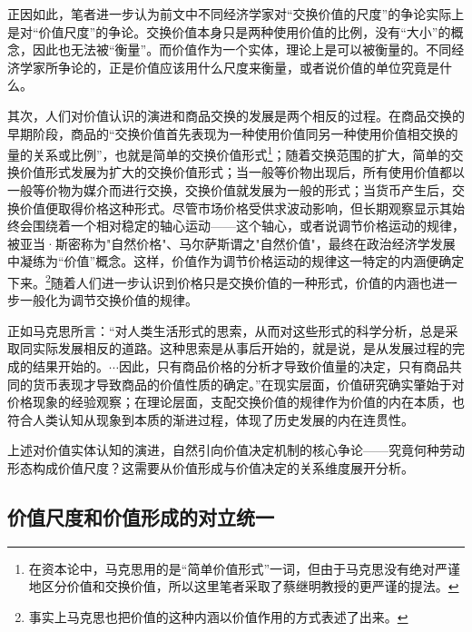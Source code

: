 正因如此，笔者进一步认为前文中不同经济学家对“交换价值的尺度”的争论实际上是对“价值尺度”的争论。交换价值本身只是两种使用价值的比例，没有“大小”的概念，因此也无法被“衡量”。而价值作为一个实体，理论上是可以被衡量的。不同经济学家所争论的，正是价值应该用什么尺度来衡量，或者说价值的单位究竟是什么。

其次，人们对价值认识的演进和商品交换的发展是两个相反的过程。在商品交换的早期阶段，商品的“交换价值首先表现为一种使用价值同另一种使用价值相交换的量的关系或比例”\cite[49]{ZhongGongZhongYangMaKeSiEnGeSiLieNingSiDaLinZhuZuoBianYiJuMaKeSiEnGeSiWenJiDi5Juan2009}，也就是简单的交换价值形式\footnote{在资本论中，马克思用的是“简单价值形式”一词，但由于马克思没有绝对严谨地区分价值和交换价值\cite[37]{ZhongGongZhongYangMaKeSiEnGeSiLieNingSiDaLinZhuZuoBianYiJuMaKeSiEnGeSiWenJiDi8Juan2009}，所以这里笔者采取了蔡继明教授的更严谨的提法\cite[145]{CaiJiMingJieZhiZhengLunHuiGuYuZhanWang2008}。}；随着交换范围的扩大，简单的交换价值形式发展为扩大的交换价值形式；当一般等价物出现后，所有使用价值都以一般等价物为媒介而进行交换，交换价值就发展为一般的形式；当货币产生后，交换价值便取得价格这种形式。尽管市场价格受供求波动影响，但长期观察显示其始终会围绕着一个相对稳定的轴心运动——这个轴心，或者说调节价格运动的规律，被亚当·斯密称为"自然价格"、马尔萨斯谓之"自然价值"，最终在政治经济学发展中凝练为“价值”概念。这样，价值作为调节价格运动的规律这一特定的内涵便确定下来。\cite[145]{CaiJiMingJieZhiZhengLunHuiGuYuZhanWang2008}\footnote{事实上马克思也把价值的这种内涵以价值作用的方式表述了出来\cite[199]{ZhongGongZhongYangMaKeSiEnGeSiLieNingSiDaLinZhuZuoBianYiJuMaKeSiEnGeSiWenJiDi7Juan2009}。}随着人们进一步认识到价格只是交换价值的一种形式，价值的内涵也进一步一般化为调节交换价值的规律。

正如马克思所言：“对人类生活形式的思索，从而对这些形式的科学分析，总是采取同实际发展相反的道路。这种思索是从事后开始的，就是说，是从发展过程的完成的结果开始的。$\cdots$因此，只有商品价格的分析才导致价值量的决定，只有商品共同的货币表现才导致商品的价值性质的确定。”\cite[93]{ZhongGongZhongYangMaKeSiEnGeSiLieNingSiDaLinZhuZuoBianYiJuMaKeSiEnGeSiWenJiDi5Juan2009}在现实层面，价值研究确实肇始于对价格现象的经验观察；在理论层面，支配交换价值的规律作为价值的内在本质，也符合人类认知从现象到本质的渐进过程，体现了历史发展的内在连贯性。

上述对价值实体认知的演进，自然引向价值决定机制的核心争论——究竟何种劳动形态构成价值尺度？这需要从价值形成与价值决定的关系维度展开分析。

\subsection{价值尺度和价值形成的对立统一}

